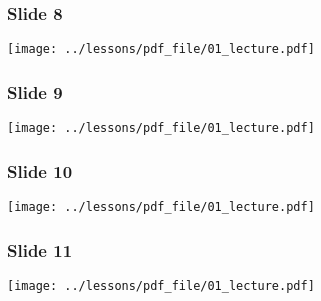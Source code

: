 \documentclass[../main/main.tex]{subfiles}
\begin{document}
\subsubsection*{Slide 8}

\begin{minipage}[]{0.5\linewidth}
\centering
\texttt{[image: ../lessons/pdf\_file/01\_lecture.pdf]}
\end{minipage}
\hspace{0.3cm}\vspace{0.3cm}
\begin{minipage}[c]{0.47\linewidth}

\end{minipage}

\subsubsection*{Slide 9}

\begin{minipage}[]{0.5\linewidth}
\centering
\texttt{[image: ../lessons/pdf\_file/01\_lecture.pdf]}
\end{minipage}
\hspace{0.3cm}\vspace{0.3cm}
\begin{minipage}[c]{0.47\linewidth}

\end{minipage}

\subsubsection*{Slide 10}

\begin{minipage}[]{0.5\linewidth}
\centering
\texttt{[image: ../lessons/pdf\_file/01\_lecture.pdf]}
\end{minipage}
\hspace{0.3cm}\vspace{0.3cm}
\begin{minipage}[c]{0.47\linewidth}

\end{minipage}

\subsubsection*{Slide 11}

\begin{minipage}[]{0.5\linewidth}
\centering
\texttt{[image: ../lessons/pdf\_file/01\_lecture.pdf]}
\end{minipage}
\hspace{0.3cm}\vspace{0.3cm}
\begin{minipage}[c]{0.47\linewidth}

\end{minipage}
\end{document}
